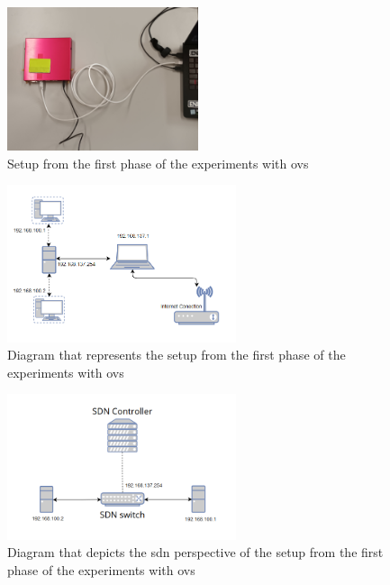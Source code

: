 \begin{figure}
	\centering
	\includegraphics[width=0.5\textwidth]{Chapters/Figures/tests/ovs_phase_1/20241122_155830.jpg}
	\caption{Setup from the first phase of the experiments with \gls{ovs}}
	\label{fig:exp1_phase1_setup}
\end{figure}

\begin{figure}
	\centering
	\includegraphics[width=0.6\textwidth]{Chapters/Figures/tests/ovs_phase_1/setup_diagram.PNG}
	\caption{Diagram that represents the setup from the first phase of the experiments with \gls{ovs}}
	\label{fig:exp1_phase1_diagram}
\end{figure}

\begin{figure}
	\centering
	\includegraphics[width=0.6\textwidth]{Chapters/Figures/tests/ovs_phase_1/sdn_diagram.PNG}
	\caption{Diagram that depicts the \gls{sdn} perspective of the setup from the first phase of the experiments with \gls{ovs}}
	\label{fig:exp1_phase1_sdn_diagram}
\end{figure}


